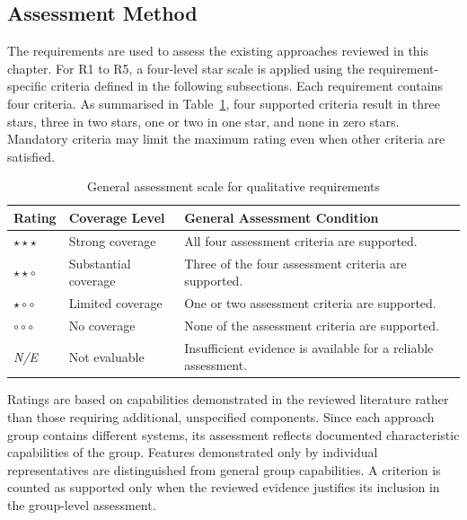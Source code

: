 

\subsection{Assessment Method}
\label{subsec:requirements_assessment_method}

The requirements are used to assess the existing approaches
reviewed in this chapter. For R1 to R5, a four-level star scale
is applied using the requirement-specific criteria defined
in the following subsections. Each requirement contains four
criteria. As summarised in Table~\ref{tab:general_assessment_scale},
four supported criteria result in three stars, three in
two stars, one or two in one star, and none in zero stars.
Mandatory criteria may limit the maximum rating even when
other criteria are satisfied.

\begin{table}[H]
\centering
\small
\begin{tabular}{p{1.5cm} p{3.5cm} p{8.3cm}}
\hline
\textbf{Rating} &
\textbf{Coverage Level} &
\textbf{General Assessment Condition} \\ \hline

$\star\star\star$ & Strong coverage &
All four assessment criteria are supported. \\

$\star\star\circ$ & Substantial coverage &
Three of the four assessment criteria are supported. \\

$\star\circ\circ$ & Limited coverage &
One or two assessment criteria are supported. \\

$\circ\circ\circ$ & No coverage &
None of the assessment criteria are supported. \\

\textit{N/E} & Not evaluable &
Insufficient evidence is available for a reliable assessment. \\

\hline
\end{tabular}
\caption{General assessment scale for qualitative requirements}
\label{tab:general_assessment_scale}
\end{table}

Ratings are based on capabilities demonstrated in the
reviewed literature rather than those requiring additional,
unspecified components. Since each approach group contains
different systems, its assessment reflects documented
characteristic capabilities of the group. Features
demonstrated only by individual representatives are
distinguished from general group capabilities. A criterion
is counted as supported only when the reviewed evidence
justifies its inclusion in the group-level assessment.

